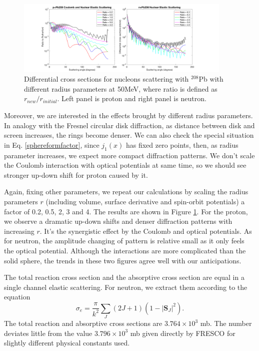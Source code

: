     \begin{figure}[t]
		\centering
		\includegraphics[width=0.92\textwidth]{7.png}
		\caption{Differential cross sections for nucleons scattering with $^{208}$Pb with different radius parameters at 50MeV, where ratio is defined as $r_{new}/r_{initial}$. Left panel is proton and right panel is neutron.  }
		\label{fig:radiusparameter}
	\end{figure}

	Moreover, we are interested in the effects brought by different radius parameters. 
	In analogy with the Fresnel circular disk diffraction, as distance between disk and screen increases, the rings become denser.
	We can also check the special situation in Eq. \ref{sphereformfactor}, since $j_1(x)$ has fixed zero points, then, as radius parameter increases, we expect more compact diffraction patterns. 
	We don't scale the Coulomb interaction with optical potentials at same time, so we should see stronger up-down shift for proton caused by it.
	
	Again, fixing other parameters, we repeat our calculations by scaling the radius parameters $r$ (including volume, surface derivative and spin-orbit potentials) a factor of 0.2, 0.5, 2, 3 and 4. 
	The results are shown in Figure \ref{fig:radiusparameter}.
	For the proton, we observe a dramatic up-down shifts and denser diffraction patterns with increasing $r$. 
	It's the synergistic effect by the Coulomb and optical potentials. 
	As for neutron, the amplitude changing of pattern is relative small as it only feels the optical potential. 
	Although the interactions are more complicated than the solid sphere, the trends in these two figures agree well with our anticipations.
	
	The total reaction cross section and the absorptive cross section are equal in a single channel elastic scattering. For neutron, we extract them according to the equation
	\begin{equation}
		\sigma_{e}=\frac{\pi}{k^2}\sum_{J}(2J+1)(1-|\mathbf{S}_J|^2).
			\end{equation}
	The total reaction and absorptive cross sections are $3.764\times 10^3$ mb. The number deviates little from the value $3.796\times 10^3$ mb given directly by FRESCO for slightly different physical constants used.
	
